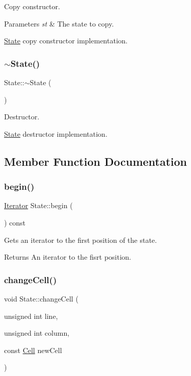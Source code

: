 Copy constructor.


\begin{DoxyParams}{Parameters}
{\em st} & The state to copy.\\
\hline
\end{DoxyParams}
\mbox{\hyperlink{class_state}{State}} copy constructor implementation. \mbox{\label{class_state_afab438d92b90dc18d194dbd9c9c8bab3}} 
\subsubsection{\texorpdfstring{$\sim$\+State()}{~State()}}
{\footnotesize\ttfamily State\+::$\sim$\+State (\begin{DoxyParamCaption}{ }\end{DoxyParamCaption})}

Destructor.

\mbox{\hyperlink{class_state}{State}} destructor implementation. 

\subsection{Member Function Documentation}
\mbox{\label{class_state_a586600f9cce93894c1804104db734cf6}} 
\subsubsection{\texorpdfstring{begin()}{begin()}}
{\footnotesize\ttfamily \mbox{\hyperlink{class_state_1_1_iterator}{Iterator}} State\+::begin (\begin{DoxyParamCaption}{ }\end{DoxyParamCaption}) const\hspace{0.3cm}{\ttfamily [inline]}}

Gets an iterator to the first position of the state.

\begin{DoxyReturn}{Returns}
An iterator to the fisrt position. 
\end{DoxyReturn}
\mbox{\label{class_state_abede2d4d10b22198b91d3392870c786d}} 
\subsubsection{\texorpdfstring{change\+Cell()}{changeCell()}}
{\footnotesize\ttfamily void State\+::change\+Cell (\begin{DoxyParamCaption}\item[{unsigned int}]{line,  }\item[{unsigned int}]{column,  }\item[{const \mbox{\hyperlink{class_cell}{Cell}}}]{new\+Cell }\end{DoxyParamCaption})\hspace{0.3cm}{\ttfamily [inline]}}

